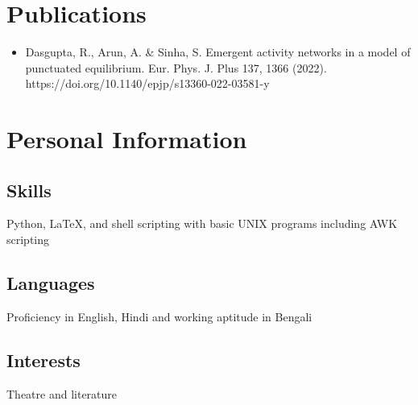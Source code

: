 \documentclass{article}
\begin{document}
\section{Publications}
\begin{itemize}
	\item Dasgupta, R., Arun, A. \& Sinha, S. Emergent activity networks in a model of punctuated equilibrium. Eur. Phys. J. Plus 137, 1366 (2022). https://doi.org/10.1140/epjp/s13360-022-03581-y
\end{itemize}

\section{Personal Information}

\subsection{Skills}
Python,
\LaTeX,
and shell scripting with basic UNIX programs
including AWK scripting

\subsection{Languages}
Proficiency in English, Hindi
and working aptitude in Bengali
\subsection{Interests}
Theatre and literature


\end{document}
